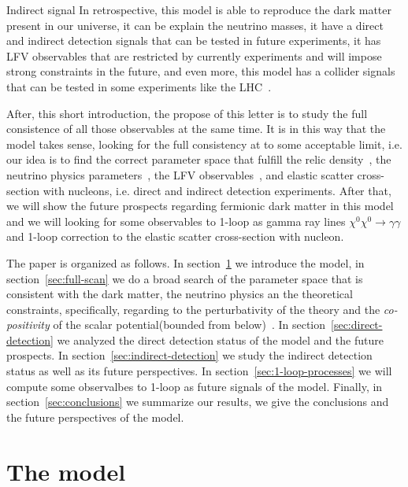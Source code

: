\documentclass[12pt,letterpaper]{article}
\begin{document}
%
Indirect signal
%
In retrospective, this model is able to reproduce the dark matter present in our universe, it can be explain the neutrino masses, it have a direct and indirect detection signals that can be tested in future experiments, it has LFV observables that are restricted by currently experiments and will impose strong constraints in the future, and even more, this model has a collider signals that can be tested in some experiments like the LHC~\cite{Choubey:2017yyn}. 

After, this short introduction, the propose of this letter is to study the full consistence of all those observables at the same time. It is in this way that the model takes sense, looking for the full consistency at to some acceptable limit, i.e. 
our idea is to find the correct parameter space that fulfill the relic density~\cite{Aghanim:2018eyx}, the neutrino physics parameters~\cite{Forero:2014bxa, deSalas:2017kay}, the LFV observables~\cite{Rocha-Moran:2016enp}, and elastic scatter cross-section with nucleons, i.e. direct and indirect detection experiments. 
After that, we will show the future prospects regarding fermionic dark matter in this model and we will looking for some observables to 1-loop as gamma ray lines $\chi^0\chi^0\to\gamma\gamma$ and 1-loop correction to the elastic scatter cross-section with nucleon.

The paper is organized as follows. In section~\ref{sec:model} we introduce the model, in section~\ref{sec:full-scan} we do a broad search of the parameter space that is consistent with the dark matter, the neutrino physics an the theoretical constraints, specifically, regarding to the perturbativity of the theory and the \textit{co-positivity} of the scalar potential(bounded from below)~\cite{Merle:2016scw}. 
In section~\ref{sec:direct-detection} we analyzed the direct detection status of the model and the future prospects. In section~\ref{sec:indirect-detection} we study the indirect detection status as well as its future perspectives.
In section~\ref{sec:1-loop-processes} we will compute some observalbes to 1-loop as future signals of the model.
Finally, in section~\ref{sec:conclusions} we summarize our results, we give the conclusions and the future perspectives of the model.







\section{The model}
\label{sec:model}
\end{document}
